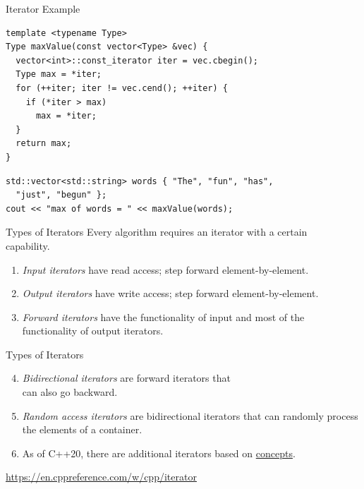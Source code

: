 \documentclass[14pt,aspectratio=1610]{beamer}
\begin{document}
\begin{frame}[fragile]{Iterator Example}
  \small
\begin{lstlisting}
template <typename Type>
Type maxValue(const vector<Type> &vec) {
  vector<int>::const_iterator iter = vec.cbegin();
  Type max = *iter;
  for (++iter; iter != vec.cend(); ++iter) {
    if (*iter > max)
      max = *iter;
  }
  return max;
}
\end{lstlisting}

\begin{lstlisting}
std::vector<std::string> words { "The", "fun", "has",
  "just", "begun" };
cout << "max of words = " << maxValue(words);
\end{lstlisting}
\end{frame}

\begin{frame}[fragile]{Types of Iterators}
Every algorithm requires an iterator with a certain\\
capability.
\pause{}
\begin{enumerate}[<+->]
\item
  \emph{Input iterators} have read access; step forward element-by-element.
\item
  \emph{Output iterators} have write access; step forward element-by-element.
\item
  \emph{Forward iterators} have the functionality of input and most of the functionality of output iterators.

\end{enumerate}
\end{frame}

\begin{frame}[fragile]{Types of Iterators}
\begin{enumerate}[<+->]
  \setcounter{enumi}{3}
\item
  \emph{Bidirectional iterators} are forward iterators that\\ can also go backward.
\item
  \emph{Random access iterators} are bidirectional iterators that can randomly process the elements of a container.
\item 
  As of C++20, there are additional iterators based on \href{https://en.cppreference.com/w/cpp/language/constraints}{concepts}.
\end{enumerate}

\pause{}
\href{https://en.cppreference.com/w/cpp/iterator}{https://en.cppreference.com/w/cpp/iterator}
\end{frame}
\end{document}
